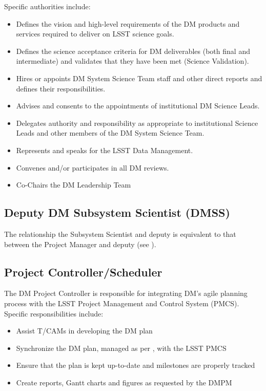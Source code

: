 Specific authorities include:

\begin{itemize}
\item Defines the vision and high-level requirements of the DM products and services required to deliver on LSST science goals.
\item Defines the science acceptance criteria for DM deliverables (both final and intermediate) and validates that they have been met (Science Validation).
\item Hires or appoints DM System Science Team staff and other direct reports and defines their responsibilities.
\item Advises and consents to the appointments of institutional DM Science Leads.
\item Delegates authority and responsibility as appropriate to institutional Science Leads and other members of the DM System Science Team.
\item Represents and speaks for the LSST Data Management.
\item Convenes and/or participates in all DM reviews.
\item Co-Chairs the DM Leadership Team
\end{itemize}

\subsection{Deputy DM Subsystem Scientist (DMSS) \label{role:ddmss} }

The relationship the Subsystem Scientist and deputy is equivalent to that
between the Project Manager and deputy (see ).


\subsection{Project Controller/Scheduler \label{role:pcon}}

The DM Project Controller is responsible for integrating DM's agile planning process with the LSST Project Management and Control System (PMCS). Specific responsibilities include:

\begin{itemize}

  \item{Assist T/CAMs in developing the DM plan}
  \item{Synchronize the DM plan, managed as per , with the LSST PMCS}
  \item{Ensure that the plan is kept up-to-date and milestones are properly tracked}
  \item{Create reports, Gantt charts and figures as requested by the DMPM}

\end{itemize}

